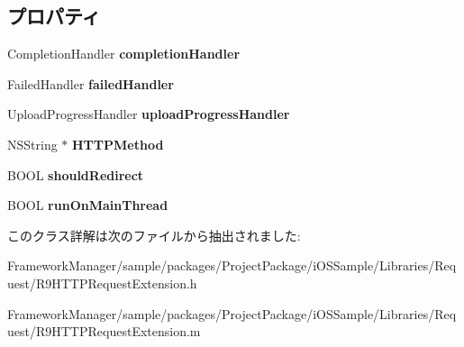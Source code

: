 \subsection*{プロパティ}
\begin{DoxyCompactItemize}
\item 
\hypertarget{interface_r9_h_t_t_p_request_extension_a555c7e217ecef45f7897095909104e3a}{}Completion\+Handler {\bfseries completion\+Handler}\label{interface_r9_h_t_t_p_request_extension_a555c7e217ecef45f7897095909104e3a}

\item 
\hypertarget{interface_r9_h_t_t_p_request_extension_a73a2dce0f486761d4fd2b9fd869d848d}{}Failed\+Handler {\bfseries failed\+Handler}\label{interface_r9_h_t_t_p_request_extension_a73a2dce0f486761d4fd2b9fd869d848d}

\item 
\hypertarget{interface_r9_h_t_t_p_request_extension_a9754685f66fa27ea8a7a9138b5d652d1}{}Upload\+Progress\+Handler {\bfseries upload\+Progress\+Handler}\label{interface_r9_h_t_t_p_request_extension_a9754685f66fa27ea8a7a9138b5d652d1}

\item 
\hypertarget{interface_r9_h_t_t_p_request_extension_ad0c8a260caae5e315a968eebfc643d3c}{}N\+S\+String $\ast$ {\bfseries H\+T\+T\+P\+Method}\label{interface_r9_h_t_t_p_request_extension_ad0c8a260caae5e315a968eebfc643d3c}

\item 
\hypertarget{interface_r9_h_t_t_p_request_extension_a46c0c352a3e5cb1f867bf12ee796594a}{}B\+O\+O\+L {\bfseries should\+Redirect}\label{interface_r9_h_t_t_p_request_extension_a46c0c352a3e5cb1f867bf12ee796594a}

\item 
\hypertarget{interface_r9_h_t_t_p_request_extension_a8cde4de955fe40e1fca5037f70e304fa}{}B\+O\+O\+L {\bfseries run\+On\+Main\+Thread}\label{interface_r9_h_t_t_p_request_extension_a8cde4de955fe40e1fca5037f70e304fa}

\end{DoxyCompactItemize}


このクラス詳解は次のファイルから抽出されました\+:\begin{DoxyCompactItemize}
\item 
Framework\+Manager/sample/packages/\+Project\+Package/i\+O\+S\+Sample/\+Libraries/\+Request/R9\+H\+T\+T\+P\+Request\+Extension.\+h\item 
Framework\+Manager/sample/packages/\+Project\+Package/i\+O\+S\+Sample/\+Libraries/\+Request/R9\+H\+T\+T\+P\+Request\+Extension.\+m\end{DoxyCompactItemize}
